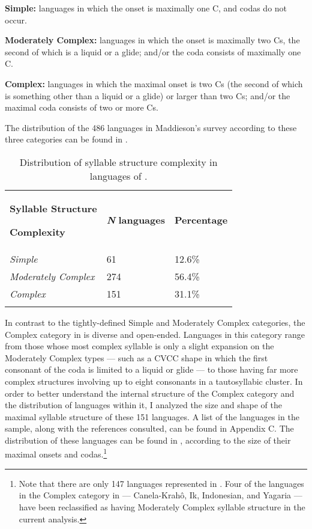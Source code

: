 \textbf{Simple:} languages in which the onset is maximally one C, and codas do not occur.

\textbf{Moderately Complex:} languages in which the onset is maximally two Cs, the second of which is a liquid or a glide; and/or the coda consists of maximally one C.

\textbf{Complex:} languages in which the maximal onset is two Cs (the second of which is something other than a liquid or a glide) or larger than two Cs; and/or the maximal coda consists of two or more Cs.

The distribution of the 486 languages in Maddieson's survey according to these three categories can be found in .

\begin{table}
\begin{tabularx}{\textwidth}{XXX}
\lsptoprule

\textbf{Syllable Structure} 

\textbf{Complexity} & \textbf{\textit{N}} \textbf{languages} & \textbf{Percentage}\\
\textit{Simple} & 61 & 12.6\%\\
\textit{Moderately Complex} & 274 & 56.4\%\\
\textit{Complex} & 151 & 31.1\%\\
\lspbottomrule
\end{tabularx}
\caption{\label{tab:2.1} Distribution of syllable structure complexity in languages of \citet{Maddieson2013a}.}
\end{table}

  In contrast to the tightly-defined Simple and Moderately Complex categories, the Complex category in \citet{Maddieson2013a} is diverse and open-ended. Languages in this category range from those whose most complex syllable is only a slight expansion on the Moderately Complex types — such as a CVCC shape in which the first consonant of the coda is limited to a liquid or glide — to those having far more complex structures involving up to eight consonants in a tautosyllabic cluster. In order to better understand the internal structure of the Complex category and the distribution of languages within it, I analyzed the size and shape of the maximal syllable structure of these 151 languages. A list of the languages in the sample, along with the references consulted, can be found in Appendix C. The distribution of these languages can be found in , according to the size of their maximal onsets and codas.\footnote{{Note that there are only 147 languages represented in . Four of the languages in the Complex category in \citet{Maddieson2013a} — Canela-Krahô, Ik, Indonesian, and Yagaria — have been reclassified as having Moderately Complex syllable structure in the current analysis.}}

